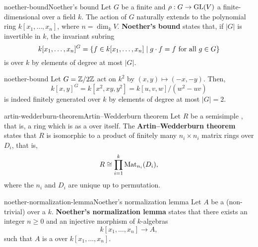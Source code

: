 \begin{topic}{noether-bound}{Noether's bound}
    Let $G$ be a finite  and $\rho : G \to \textup{GL}(V)$ a finite-dimensional  over a field $k$. The action of $G$ naturally extends to the polynomial ring $k[x_1, \ldots, x_n]$, where $n = \dim_k V$. \textbf{Noether's bound} states that, if $|G|$ is invertible in $k$, the invariant subring
    \[ k[x_1, \ldots, x_n]^G = \{ f \in k[x_1, \ldots, x_n] \mid g \cdot f = f \textup{ for all } g \in G \} \]
    is  over $k$ by elements of degree at most $|G|$.
\end{topic}

\begin{example}{noether-bound}
    Let $G = \mathbb{Z}/2\mathbb{Z}$ act on $k^2$ by $(x, y) \mapsto (-x, -y)$. Then,
    \[ k[x, y]^G = k[x^2, xy, y^2] = k[u, v, w] / (w^2 - uv) \]
    is indeed finitely generated over $k$ by elements of degree at most $|G| = 2$.
\end{example}

\begin{topic}{artin-wedderburn-theorem}{Artin--Wedderburn theorem}
    Let $R$ be a semisimple , that is, a ring which is  as a  over itself. The \textbf{Artin--Wedderburn theorem} states that $R$ is isomorphic to a product of finitely many $n_i \times n_i$ matrix rings over  $D_i$, that is,
    \[ R \cong \prod_{i = 1}^{k} \textup{Mat}_{n_i}(D_i) , \]
    where the $n_i$ and $D_i$ are unique up to permutation.
\end{topic}

\begin{topic}{noether-normalization-lemma}{Noether's normalization lemma}
    Let $A$ be a (non-trivial)  over a  $k$. \textbf{Noether's normalization lemma} states that there exists an integer $n \ge 0$ and an injective morphism of $k$-algebras
    \[ k[x_1, \ldots, x_n] \to A , \]
    such that $A$ is a  over $k[x_1, \ldots, x_n]$.
\end{topic}

